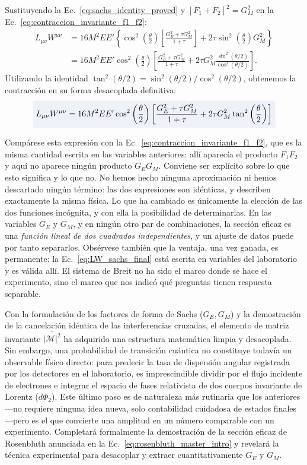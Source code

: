 \documentclass[10pt,a4paper]{article}
\newcommand{\dest}[1]{{\setlength{\fboxsep}{4pt}\colorbox{colordest}{$\displaystyle #1$}}}
\begin{document}
Sustituyendo la Ec.~\eqref{eq:sachs_identity_proved} y $[F_1 + F_2]^2 = G_M^2$ en la Ec.~\eqref{eq:contraccion_invariante_f1_f2}:
\begin{align}
L_{\mu\nu} W^{\mu\nu} &= 16 M^2 E E' \left\{ \cos^2\left(\frac{\theta}{2}\right) \left[ \frac{G_E^2 + \tau G_M^2}{1 + \tau} \right] + 2\tau \sin^2\left(\frac{\theta}{2}\right) G_M^2 \right\} \nonumber \\
&= 16 M^2 E E' \cos^2\left(\frac{\theta}{2}\right) \left[ \frac{G_E^2 + \tau G_M^2}{1 + \tau} + 2\tau G_M^2 \frac{\sin^2(\theta/2)}{\cos^2(\theta/2)} \right].
\end{align}
Utilizando la identidad $\tan^2(\theta/2) = \sin^2(\theta/2)/\cos^2(\theta/2)$, obtenemos la contracción en su forma desacoplada definitiva:
\begin{equation}
\dest{
L_{\mu\nu} W^{\mu\nu} = 16 M^2 E E' \cos^2\left(\frac{\theta}{2}\right) \left[ \frac{G_E^2 + \tau G_M^2}{1 + \tau} + 2\tau G_M^2 \tan^2\left(\frac{\theta}{2}\right) \right]
}
\label{eq:LW_sachs_final}
\end{equation}

Compárese esta expresión con la Ec.~\eqref{eq:contraccion_invariante_f1_f2}, que es la misma cantidad escrita en las variables anteriores: allí aparecía el producto $F_1F_2$ y aquí no aparece ningún producto $G_EG_M$. Conviene ser explícito sobre lo que esto significa y lo que no. No hemos hecho ninguna aproximación ni hemos descartado ningún término: las dos expresiones son idénticas, y describen exactamente la misma física. Lo que ha cambiado es únicamente la elección de las dos funciones incógnita, y con ella la posibilidad de determinarlas. En las variables $G_E$ y $G_M$, y en ningún otro par de combinaciones, la sección eficaz es una \emph{función lineal de dos cuadrados independientes}, y un ajuste de datos puede por tanto separarlos. Obsérvese también que la ventaja, una vez ganada, es permanente: la Ec.~\eqref{eq:LW_sachs_final} está escrita en variables del laboratorio y es válida allí. El sistema de Breit no ha sido el marco donde se hace el experimento, sino el marco que nos indicó qué preguntas tienen respuesta separable.


Con la formulación de los factores de forma de Sachs ($G_E, G_M$) y la demostración de la cancelación idéntica de las interferencias cruzadas, el elemento de matriz invariante $\overline{|\mathcal{M}|^2}$ ha adquirido una estructura matemática limpia y desacoplada. Sin embargo, una probabilidad de transición cuántica no constituye todavía un observable físico directo: para predecir la tasa de dispersión angular registrada por los detectores en el laboratorio, es imprescindible dividir por el flujo incidente de electrones e integrar el espacio de fases relativista de dos cuerpos invariante de Lorentz ($d\Phi_2$). Este último paso es de naturaleza más rutinaria que los anteriores---no requiere ninguna idea nueva, solo contabilidad cuidadosa de estados finales---pero es el que convierte una amplitud en un número comparable con un experimento. Completará formalmente la demostración de la sección eficaz de Rosenbluth anunciada en la Ec.~\eqref{eq:rosenbluth_master_intro} y revelará la técnica experimental para desacoplar y extraer cuantitativamente $G_E$ y $G_M$.
\end{document}
